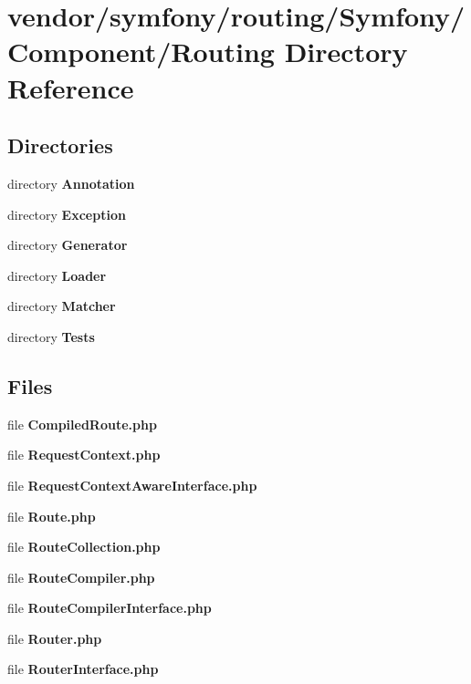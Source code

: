 \section{vendor/symfony/routing/\+Symfony/\+Component/\+Routing Directory Reference}
\label{dir_7dc7d321f092252a9e0f9e806ac2f455}
\subsection*{Directories}
\begin{DoxyCompactItemize}
\item 
directory {\bf Annotation}
\item 
directory {\bf Exception}
\item 
directory {\bf Generator}
\item 
directory {\bf Loader}
\item 
directory {\bf Matcher}
\item 
directory {\bf Tests}
\end{DoxyCompactItemize}
\subsection*{Files}
\begin{DoxyCompactItemize}
\item 
file {\bf Compiled\+Route.\+php}
\item 
file {\bf Request\+Context.\+php}
\item 
file {\bf Request\+Context\+Aware\+Interface.\+php}
\item 
file {\bf Route.\+php}
\item 
file {\bf Route\+Collection.\+php}
\item 
file {\bf Route\+Compiler.\+php}
\item 
file {\bf Route\+Compiler\+Interface.\+php}
\item 
file {\bf Router.\+php}
\item 
file {\bf Router\+Interface.\+php}
\end{DoxyCompactItemize}
